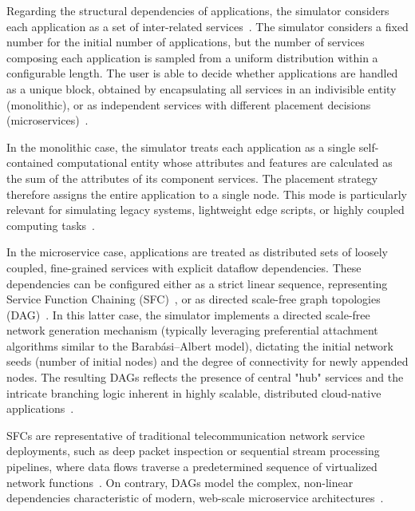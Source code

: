 \documentclass[ASNA]{USG} %
\begin{document}
Regarding the structural dependencies of applications, the simulator considers each application as a set of inter-related services~\cite{Cerny2024From}. The simulator considers a fixed number for the initial number of applications, but the number of services composing each application is sampled from a uniform distribution within a configurable length. The user is able to decide whether applications are handled as a unique block, obtained by encapsulating all services in an indivisible entity (monolithic), or as independent services with different placement decisions (microservices)~\cite{Ali2024EdgeBus}.

In the monolithic case, the simulator treats each application as a single self-contained computational entity whose attributes and features are calculated as the sum of the attributes of its component services. The placement strategy therefore assigns the entire application to a single node. This mode is particularly relevant for simulating legacy systems, lightweight edge scripts, or highly coupled computing tasks~\cite{Oyeniran2024Microservices}.

In the microservice case, applications are treated as distributed sets of loosely coupled, fine-grained services with explicit dataflow dependencies. These dependencies can be configured either as a strict linear sequence, representing Service Function Chaining (SFC)~\cite{Thiruvasagam2021Reliable}, or as directed scale-free graph topologies (DAG)~\cite{Cerny2024From}. In this latter case, the simulator implements a directed scale-free network generation mechanism (typically leveraging preferential attachment algorithms similar to the Barabási–Albert model), dictating the initial network seeds (number of initial nodes) and the degree of connectivity for newly appended nodes. The resulting DAGs reflects the presence of central "hub" services and the intricate branching logic inherent in highly scalable, distributed cloud-native applications~\cite{Zhao2022DAG}.

SFCs are representative of traditional telecommunication network service deployments, such as deep packet inspection or sequential stream processing pipelines, where data flows traverse a predetermined sequence of virtualized network functions~\cite{Adoga2022Network}. On contrary, DAGs model the complex, non-linear dependencies characteristic of modern, web-scale microservice architectures~\cite{Borth2025Directed}.
\end{document}
